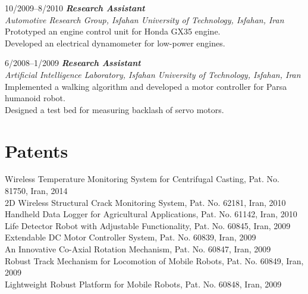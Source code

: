 \documentclass[10pt]{article}
\newlength{\Vspace}
\newlength{\Vspace}
\begin{document}
\begin{CV}
\item[10/2009--8/2010] \textbf{\textit{Research Assistant}} \\
    \textit{Automotive Research Group, Isfahan University of Technology, Isfahan, Iran}\vspace{\Vspace} \\
    Prototyped an engine control unit for Honda GX35 engine. \\
    Developed an electrical dynamometer for low-power engines.

\item[6/2008--1/2009] \textbf{\textit{Research Assistant}} \\
    \textit{Artificial Intelligence Laboratory, Isfahan University of Technology, Isfahan, Iran}\vspace{\Vspace} \\
    Implemented a walking algorithm and developed a motor controller for Parsa humanoid robot. \\
    Designed a test bed for measuring backlash of servo motors.

\end{CV}

\section{Patents}

\begin{flushleft}

Wireless Temperature Monitoring System for Centrifugal Casting, Pat. No. 81750, Iran, 2014 \vspace{\Vspace} \\
2D Wireless Structural Crack Monitoring System, Pat. No. 62181, Iran, 2010 \vspace{\Vspace} \\
Handheld Data Logger for Agricultural Applications, Pat. No. 61142, Iran, 2010 \vspace{\Vspace} \\
Life Detector Robot with Adjustable Functionality, Pat. No. 60845, Iran, 2009 \vspace{\Vspace} \\
Extendable DC Motor Controller System, Pat. No. 60839, Iran, 2009 \vspace{\Vspace} \\
An Innovative Co-Axial Rotation Mechanism, Pat. No. 60847, Iran, 2009 \vspace{\Vspace} \\
Robust Track Mechanism for Locomotion of Mobile Robots, Pat. No. 60849, Iran, 2009 \vspace{\Vspace} \\
Lightweight Robust Platform for Mobile Robots, Pat. No. 60848, Iran, 2009

\end{flushleft}
\end{document}
